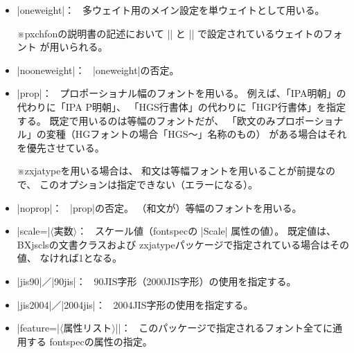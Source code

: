 \documentclass[xelatex,ja=standard,jafont=ipaex,
  a4paper]{bxjsarticle}
\newcommand{\Pkg}[1]{\textsf{#1}}
\newcommand{\Meta}[1]{$\langle$\mbox{}#1\mbox{}$\rangle$}
\newcommand{\Note}{\par\noindent ※}
\newcommand{\Means}{：\ }
\begin{document}
\begin{itemize}
\item |oneweight|\Means
多ウェイト用のメイン設定を単ウェイトとして用いる。
\Note \Pkg{pxchfon}の説明書の記述において |\setminchofont|
と |\setgothicfont| で設定されているウェイトのフォント
が用いられる。
\item |nooneweight|\Means
|oneweight|の否定。

\item |prop|\Means
プロポーショナル幅のフォントを用いる。
例えば、「IPA明朝」の代わりに「IPA P明朝」、
「HGS行書体」の代わりに「HGP行書体」を指定する。
既定で用いるのは等幅のフォントだが、
「欧文のみプロポーショナル」の変種（HGフォントの場合「HGS～」名称のもの）
がある場合はそれを優先させている。
\Note \Pkg{zxjatype}を用いる場合は、
和文は等幅フォントを用いることが前提なので、
このオプションは指定できない（エラーになる）。
\item |noprop|\Means
|prop|の否定。
（和文が）等幅のフォントを用いる。

\item |scale=|\Meta{実数}\Means
スケール値（\Pkg{fontspec}の |Scale| 属性の値）。
既定値は、\Pkg{BXjscls}の文書クラスおよび
\Pkg{zxjatype}パッケージで指定されている場合はその値、
なければ1となる。

\item |jis90|／|90jis|\Means
90JIS字形（2000JIS字形）の使用を指定する。

\item |jis2004|／|2004jis|\Means
2004JIS字形の使用を指定する。

\item |feature={|\Meta{属性リスト}|}|\Means
このパッケージで指定されるフォント全てに通用する
\Pkg{fontspec}の属性の指定。

\end{itemize}

\end{document}
